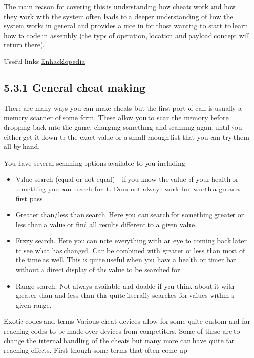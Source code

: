 \documentclass[
]{book}
\providecommand{\tightlist}{%
  \setlength{\itemsep}{0pt}\setlength{\parskip}{0pt}}
\begin{document}
The main reason for covering this is understanding how cheats work and how they work with the system often leads to a deeper understanding of how the system works in general and provides a nice in for those wanting to start to learn how to code in assembly (the type of operation, location and payload concept will return there).

Useful links \href{http://bsfree.org/hack/}{Enhacklopedia}

\hypertarget{general-cheat-making}{%
\subsection{5.3.1 General cheat making}\label{general-cheat-making}}

There are many ways you can make cheats but the first port of call is usually a memory scanner of some form. These allow you to scan the memory before dropping back into the game, changing something and scanning again until you either get it down to the exact value or a small enough list that you can try them all by hand.

You have several scanning options available to you including

\begin{itemize}
\tightlist
\item
  Value search (equal or not equal) - if you know the value of your health or something you can search for it. Does not always work but worth a go as a first pass.
\item
  Greater than/less than search. Here you can search for something greater or less than a value or find all results different to a given value.
\item
  Fuzzy search. Here you can note everything with an eye to coming back later to see what has changed. Can be combined with greater or less than most of the time as well. This is quite useful when you have a health or timer bar without a direct display of the value to be searched for.
\item
  Range search. Not always available and doable if you think about it with greater than and less than this quite literally searches for values within a given range.
\end{itemize}

Exotic codes and terms Various cheat devices allow for some quite custom and far reaching codes to be made over devices from competitors. Some of these are to change the internal handling of the cheats but many more can have quite far reaching effects. First though some terms that often come up
\end{document}
